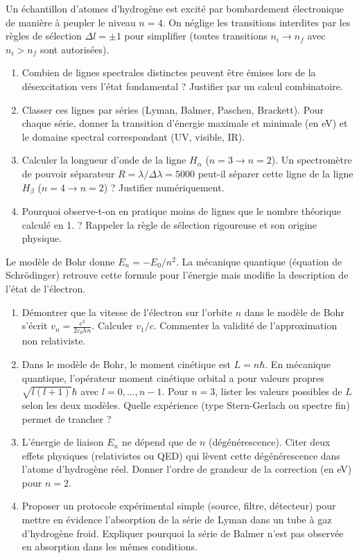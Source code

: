 \documentclass[11pt]{article}
\begin{document}
\begin{exercice}
Un échantillon d'atomes d'hydrogène est excité par bombardement électronique de manière à peupler le niveau $n=4$. On néglige les transitions interdites par les règles de sélection $\Delta l = \pm 1$ pour simplifier (toutes transitions $n_i \to n_f$ avec $n_i > n_f$ sont autorisées).
\begin{enumerate}
    \item Combien de lignes spectrales distinctes peuvent être émises lors de la désexcitation vers l'état fondamental ? Justifier par un calcul combinatoire.
    \item Classer ces lignes par séries (Lyman, Balmer, Paschen, Brackett). Pour chaque série, donner la transition d'énergie maximale et minimale (en eV) et le domaine spectral correspondant (UV, visible, IR).
    \item Calculer la longueur d'onde de la ligne $H_\alpha$ ($n=3 \to n=2$). Un spectromètre de pouvoir séparateur $R = \lambda/\Delta\lambda = 5000$ peut-il séparer cette ligne de la ligne $H_\beta$ ($n=4 \to n=2$) ? Justifier numériquement.
    \item Pourquoi observe-t-on en pratique moins de lignes que le nombre théorique calculé en 1. ? Rappeler la règle de sélection rigoureuse et son origine physique.
\end{enumerate}
\end{exercice}

\begin{exercice}
Le modèle de Bohr donne $E_n = -E_0/n^2$. La mécanique quantique (équation de Schrödinger) retrouve cette formule pour l'énergie mais modifie la description de l'état de l'électron.
\begin{enumerate}
    \item Démontrer que la vitesse de l'électron sur l'orbite $n$ dans le modèle de Bohr s'écrit $v_n = \frac{e^2}{2\varepsilon_0 h n}$. Calculer $v_1/c$. Commenter la validité de l'approximation non relativiste.
    \item Dans le modèle de Bohr, le moment cinétique est $L = n\hbar$. En mécanique quantique, l'opérateur moment cinétique orbital a pour valeurs propres $\sqrt{l(l+1)}\hbar$ avec $l = 0, \dots, n-1$. Pour $n=3$, lister les valeurs possibles de $L$ selon les deux modèles. Quelle expérience (type Stern-Gerlach ou spectre fin) permet de trancher ?
    \item L'énergie de liaison $E_n$ ne dépend que de $n$ (dégénérescence). Citer deux effets physiques (relativistes ou QED) qui lèvent cette dégénérescence dans l'atome d'hydrogène réel. Donner l'ordre de grandeur de la correction (en eV) pour $n=2$.
    \item Proposer un protocole expérimental simple (source, filtre, détecteur) pour mettre en évidence l'absorption de la série de Lyman dans un tube à gaz d'hydrogène froid. Expliquer pourquoi la série de Balmer n'est pas observée en absorption dans les mêmes conditions.
\end{enumerate}
\end{exercice}
\end{document}
